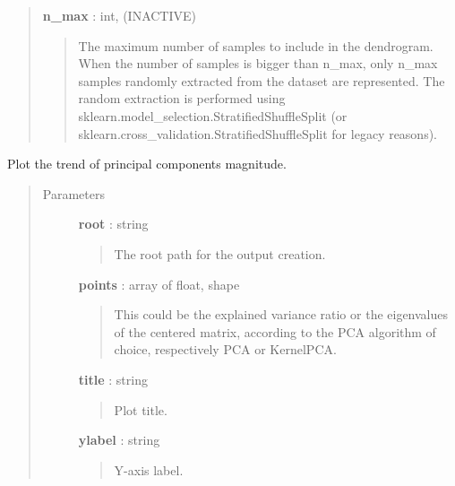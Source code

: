 \documentclass[letterpaper,10pt,english]{sphinxmanual}
\begin{document}
\begin{fulllineitems}
\begin{quote}
\begin{description}
\textbf{n\_max} : int, (INACTIVE)
\begin{quote}

The maximum number of samples to include in the dendrogram.
When the number of samples is bigger than n\_max, only n\_max samples
randomly extracted from the dataset are represented. The random
extraction is performed using
sklearn.model\_selection.StratifiedShuffleSplit
(or sklearn.cross\_validation.StratifiedShuffleSplit for legacy
reasons).
\end{quote}

\end{description}\end{quote}

\end{fulllineitems}


\begin{fulllineitems}
\label{index:adenine.core.plotting.pcmagnitude}
Plot the trend of principal components magnitude.
\begin{quote}\begin{description}
\item[{Parameters}] \leavevmode
\textbf{root} : string
\begin{quote}

The root path for the output creation.
\end{quote}

\textbf{points} : array of float, shape
\begin{quote}

This could be the explained variance ratio or the eigenvalues of the
centered matrix, according to the PCA algorithm of choice, respectively
PCA or KernelPCA.
\end{quote}

\textbf{title} : string
\begin{quote}

Plot title.
\end{quote}

\textbf{ylabel} : string
\begin{quote}

Y-axis label.
\end{quote}

\end{description}\end{quote}

\end{fulllineitems}
\end{document}

